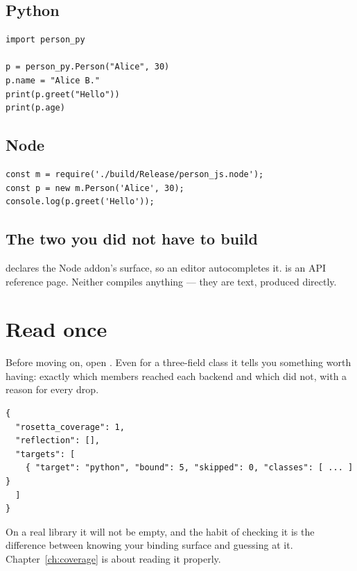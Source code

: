 \subsection*{Python}

\begin{lstlisting}[style=py]
import person_py

p = person_py.Person("Alice", 30)
p.name = "Alice B."
print(p.greet("Hello"))
print(p.age)
\end{lstlisting}

\subsection*{Node}

\begin{lstlisting}[style=js]
const m = require('./build/Release/person_js.node');
const p = new m.Person('Alice', 30);
console.log(p.greet('Hello'));
\end{lstlisting}

\subsection*{The two you did not have to build}

 declares the Node addon's surface, so an
editor autocompletes it.  is an API reference
page. Neither compiles anything --- they are text, produced directly.

\section{Read  once}

Before moving on, open . Even for a three-field
class it tells you something worth having: exactly which members reached each
backend and which did not, with a reason for every drop.

\begin{lstlisting}[style=json]
{
  "rosetta_coverage": 1,
  "reflection": [],
  "targets": [
    { "target": "python", "bound": 5, "skipped": 0, "classes": [ ... ] }
  ]
}
\end{lstlisting}

On a real library it will not be empty, and the habit of checking it is the
difference between knowing your binding surface and guessing at it.
Chapter~\ref{ch:coverage} is about reading it properly.

